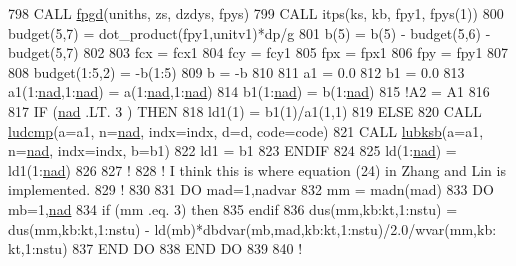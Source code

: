\begin{DoxyCode}
798 \textcolor{keyword}{CALL }\hyperlink{namespacephysics_acf841366af6f4fd7502b4031a2cacb56}{fpgd}(uniths, zs, dzdys, fpys)
799 \textcolor{keyword}{CALL }itps(ks, kb, fpy1, fpys(1))
800 budget(5,7)     = dot\_product(fpy1,unitv1)*dp/\hyperlink{namespaceconstants_a046aef138fbc8d05251d4fdc6eb3ee89}{g}
801 b(5)            = b(5) - budget(5,6) - budget(5,7)
802 
803 fcx             = fcx1
804 fcy             = fcy1
805 fpx             = fpx1
806 fpy             = fpy1
807 
808 budget(1:5,2)   = -b(1:5)
809 b               = -b
810 
811 a1              = 0.0
812 b1              = 0.0
813 a1(1:\hyperlink{namespacesettings_a4f624be133b88a44c8976b47b85e8eec}{nad},1:\hyperlink{namespacesettings_a4f624be133b88a44c8976b47b85e8eec}{nad}) = a(1:\hyperlink{namespacesettings_a4f624be133b88a44c8976b47b85e8eec}{nad},1:\hyperlink{namespacesettings_a4f624be133b88a44c8976b47b85e8eec}{nad})
814 b1(1:\hyperlink{namespacesettings_a4f624be133b88a44c8976b47b85e8eec}{nad})       = b(1:\hyperlink{namespacesettings_a4f624be133b88a44c8976b47b85e8eec}{nad})
815 \textcolor{comment}{!A2              = A1}
816 
817 \textcolor{keywordflow}{IF} (\hyperlink{namespacesettings_a4f624be133b88a44c8976b47b85e8eec}{nad} .LT. 3 ) \textcolor{keywordflow}{THEN}
818     ld1(1)  = b1(1)/a1(1,1)
819 \textcolor{keywordflow}{ELSE}
820     \textcolor{keyword}{CALL }\hyperlink{namespacelu_a578a2275703e9c18d7f262f0a3482fbe}{ludcmp}(a=a1, n=\hyperlink{namespacesettings_a4f624be133b88a44c8976b47b85e8eec}{nad}, indx=indx, d=d, code=code)
821     \textcolor{keyword}{CALL }\hyperlink{namespacelu_a588ba20d76e8dd5c49b370d9ba3ec379}{lubksb}(a=a1, n=\hyperlink{namespacesettings_a4f624be133b88a44c8976b47b85e8eec}{nad}, indx=indx, b=b1)
822     ld1     = b1
823 \textcolor{keywordflow}{ENDIF}
824 
825 ld(1:\hyperlink{namespacesettings_a4f624be133b88a44c8976b47b85e8eec}{nad})   = ld1(1:\hyperlink{namespacesettings_a4f624be133b88a44c8976b47b85e8eec}{nad})
826 
827 \textcolor{comment}{!}
828 \textcolor{comment}{! I think this is where equation (24) in Zhang and Lin is implemented.}
829 \textcolor{comment}{!}
830 
831 \textcolor{keywordflow}{DO} mad=1,nadvar
832     mm = madn(mad)
833     \textcolor{keywordflow}{DO} mb=1,\hyperlink{namespacesettings_a4f624be133b88a44c8976b47b85e8eec}{nad}
834         \textcolor{keywordflow}{if} (mm .eq. 3) \textcolor{keywordflow}{then}
835 \textcolor{keywordflow}{        endif}
836         dus(mm,kb:kt,1:nstu)    = dus(mm,kb:kt,1:nstu) - ld(mb)*dbdvar(mb,mad,kb:kt,1:nstu)/2.0/wvar(mm,kb:
      kt,1:nstu)
837 \textcolor{keywordflow}{    END DO}
838 \textcolor{keywordflow}{END DO}
839 
840 \textcolor{comment}{!}

\end{DoxyCode}
